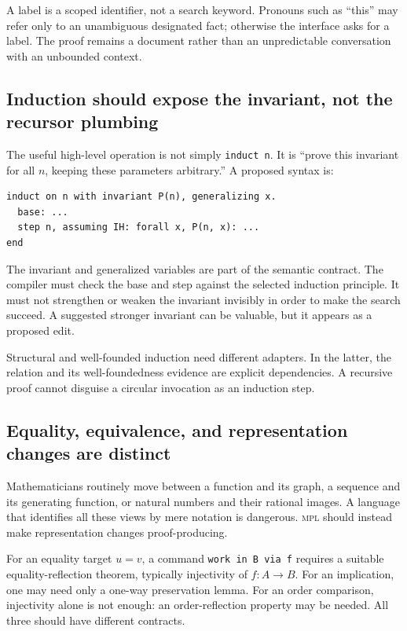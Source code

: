 \documentclass[11pt,a4paper]{article}
\newcommand{\MPL}{\textnormal{\textsc{mpl}}}
\newcommand{\code}[1]{\texttt{#1}}
\theoremstyle{remark}
\begin{document}
A label is a scoped identifier, not a search keyword. Pronouns such as ``this'' may refer only to an unambiguous designated fact; otherwise the interface asks for a label. The proof remains a document rather than an unpredictable conversation with an unbounded context.

\subsection{Induction should expose the invariant, not the recursor plumbing}

The useful high-level operation is not simply \code{induct n}. It is ``prove this invariant for all $n$, keeping these parameters arbitrary.'' A proposed syntax is:
\begin{lstlisting}
induct on n with invariant P(n), generalizing x.
  base: ...
  step n, assuming IH: forall x, P(n, x): ...
end
\end{lstlisting}
The invariant and generalized variables are part of the semantic contract. The compiler must check the base and step against the selected induction principle. It must not strengthen or weaken the invariant invisibly in order to make the search succeed. A suggested stronger invariant can be valuable, but it appears as a proposed edit.

Structural and well-founded induction need different adapters. In the latter, the relation and its well-foundedness evidence are explicit dependencies. A recursive proof cannot disguise a circular invocation as an induction step.

\subsection{Equality, equivalence, and representation changes are distinct}

Mathematicians routinely move between a function and its graph, a sequence and its generating function, or natural numbers and their rational images. A language that identifies all these views by mere notation is dangerous. \MPL{} should instead make representation changes proof-producing.

For an equality target $u=v$, a command \code{work in B via f} requires a suitable equality-reflection theorem, typically injectivity of $f:A\to B$. For an implication, one may need only a one-way preservation lemma. For an order comparison, injectivity alone is not enough: an order-reflection property may be needed. All three should have different contracts.
\end{document}

